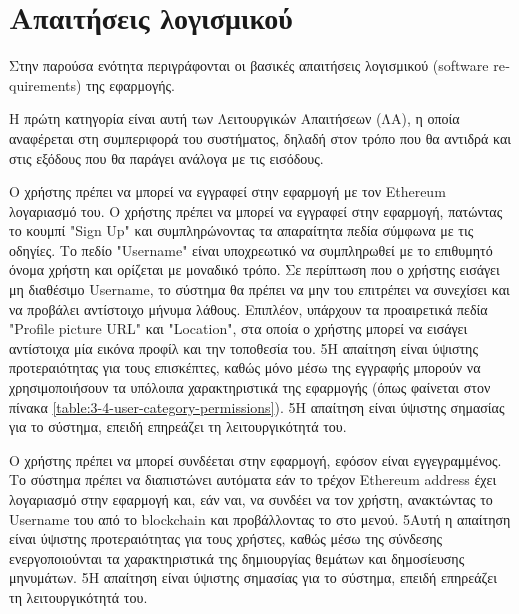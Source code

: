 \section{Απαιτήσεις λογισμικού} \label{section:3-5-software-requirements}

Στην παρούσα ενότητα περιγράφονται οι βασικές απαιτήσεις λογισμικού (\textenglish{software requirements}) της εφαρμογής.

Η πρώτη κατηγορία είναι αυτή των Λειτουργικών Απαιτήσεων (ΛΑ), η οποία αναφέρεται στη συμπεριφορά του συστήματος, δηλαδή στον τρόπο που θα αντιδρά και στις εξόδους που θα παράγει ανάλογα με τις εισόδους.

\begin{enumerate}[label=\textbf{<ΛΑ-\arabic*>}, leftmargin=\parindent, align=left, labelwidth=\parindent, labelsep=0pt]
	\sysReqItem
		{\label{srs:functional-srs-sign-up}}
		{Ο χρήστης πρέπει να μπορεί να εγγραφεί στην εφαρμογή με τον Ethereum λογαριασμό του.}
		{Ο χρήστης πρέπει να μπορεί να εγγραφεί στην εφαρμογή, πατώντας το κουμπί "Sign Up" και συμπληρώνοντας τα απαραίτητα πεδία σύμφωνα με τις οδηγίες. Το πεδίο "Username" είναι υποχρεωτικό να συμπληρωθεί με το επιθυμητό όνομα χρήστη και ορίζεται με μοναδικό τρόπο. Σε περίπτωση που ο χρήστης εισάγει μη διαθέσιμο Username, το σύστημα θα πρέπει να μην του επιτρέπει να συνεχίσει και να προβάλει αντίστοιχο μήνυμα λάθους. Επιπλέον, υπάρχουν τα προαιρετικά πεδία "Profile picture URL" και "Location", στα οποία ο χρήστης μπορεί να εισάγει αντίστοιχα μία εικόνα προφίλ και την τοποθεσία του.}
		{5}{Η απαίτηση είναι ύψιστης προτεραιότητας για τους επισκέπτες, καθώς μόνο μέσω της εγγραφής μπορούν να χρησιμοποιήσουν τα υπόλοιπα χαρακτηριστικά της εφαρμογής (όπως φαίνεται στον πίνακα \ref{table:3-4-user-category-permissions}).}
		{5}{Η απαίτηση είναι ύψιστης σημασίας για το σύστημα, επειδή επηρεάζει τη λειτουργικότητά του.}

	\sysReqItem
		{\label{srs:functional-srs-sign-in}}
		{Ο χρήστης πρέπει να μπορεί συνδέεται στην εφαρμογή, εφόσον είναι εγγεγραμμένος.}
		{Το σύστημα πρέπει να διαπιστώνει αυτόματα εάν το τρέχον Ethereum address έχει λογαριασμό στην εφαρμογή και, εάν ναι, να συνδέει να τον χρήστη, ανακτώντας το Username του από το blockchain και προβάλλοντας το στο μενού.}
		{5}{Αυτή η απαίτηση είναι ύψιστης προτεραιότητας για τους χρήστες, καθώς μέσω της σύνδεσης ενεργοποιούνται τα χαρακτηριστικά της δημιουργίας θεμάτων και δημοσίευσης μηνυμάτων.}
		{5}{Η απαίτηση είναι ύψιστης σημασίας για το σύστημα, επειδή επηρεάζει τη λειτουργικότητά του.}


\end{enumerate}
